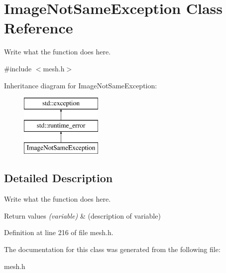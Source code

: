 \hypertarget{classImageNotSameException}{\section{Image\+Not\+Same\+Exception Class Reference}
\label{classImageNotSameException}
}


Write what the function does here.  




{\ttfamily \#include $<$mesh.\+h$>$}

Inheritance diagram for Image\+Not\+Same\+Exception\+:\begin{figure}[H]
\begin{center}
\leavevmode
\includegraphics[height=3.000000cm]{classImageNotSameException}
\end{center}
\end{figure}


\subsection{Detailed Description}
Write what the function does here. 


\begin{DoxyRetVals}{Return values}
{\em (variable)} & (description of variable) \\
\hline
\end{DoxyRetVals}


Definition at line 216 of file mesh.\+h.



The documentation for this class was generated from the following file\+:\begin{DoxyCompactItemize}
\item 
mesh.\+h\end{DoxyCompactItemize}
